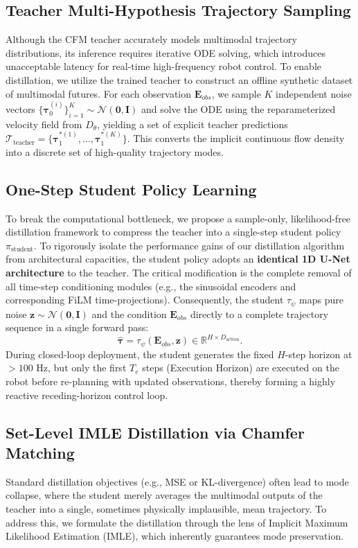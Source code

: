 \subsection{Teacher Multi-Hypothesis Trajectory Sampling}
Although the CFM teacher accurately models multimodal trajectory distributions, its inference requires iterative ODE solving, which introduces unacceptable latency for real-time high-frequency robot control. To enable distillation, we utilize the trained teacher to construct an offline synthetic dataset of multimodal futures. For each observation $\mathbf{E}_{obs}$, we sample $K$ independent noise vectors $\{\boldsymbol{\tau}_0^{(i)}\}_{i=1}^K \sim \mathcal{N}(\mathbf{0}, \mathbf{I})$ and solve the ODE using the reparameterized velocity field from $D_\theta$, yielding a set of explicit teacher predictions $\mathcal{T}_{\text{teacher}} = \{\boldsymbol{\tau}_1^{*(1)}, \dots, \boldsymbol{\tau}_1^{*(K)}\}$. This converts the implicit continuous flow density into a discrete set of high-quality trajectory modes.

\subsection{One-Step Student Policy Learning}
To break the computational bottleneck, we propose a sample-only, likelihood-free distillation framework to compress the teacher into a single-step student policy $\pi_{\text{student}}$. To rigorously isolate the performance gains of our distillation algorithm from architectural capacities, the student policy adopts an \textbf{identical 1D U-Net architecture} to the teacher. The critical modification is the complete removal of all time-step conditioning modules (e.g., the sinusoidal encoders and corresponding FiLM time-projections). Consequently, the student $\tau_\psi$ maps pure noise $\mathbf{z} \sim \mathcal{N}(\mathbf{0}, \mathbf{I})$ and the condition $\mathbf{E}_{obs}$ directly to a complete trajectory sequence in a single forward pass:
\begin{equation}
    \hat{\boldsymbol{\tau}} = \tau_\psi(\mathbf{E}_{obs}, \mathbf{z}) \in \mathbb{R}^{H \times D_{\text{action}}}.
\end{equation}
During closed-loop deployment, the student generates the fixed $H$-step horizon at $>100$ Hz, but only the first $T_e$ steps (Execution Horizon) are executed on the robot before re-planning with updated observations, thereby forming a highly reactive receding-horizon control loop.

\subsection{Set-Level IMLE Distillation via Chamfer Matching}
Standard distillation objectives (e.g., MSE or KL-divergence) often lead to mode collapse, where the student merely averages the multimodal outputs of the teacher into a single, sometimes physically implausible, mean trajectory. To address this, we formulate the distillation through the lens of Implicit Maximum Likelihood Estimation (IMLE), which inherently guarantees mode preservation.

